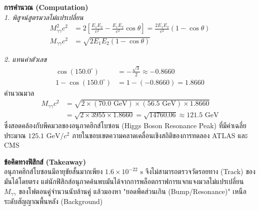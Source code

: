 \begin{psctexample}
\textbf{การคำนวณ (Computation)} \\
\textit{1. พิสูจน์สูตรมวลไม่แปรเปลี่ยน}
\begin{align}
M_{\gamma\gamma}^2 c^2 &= 2 \left[\frac{E_1 E_2}{c^2} - \frac{E_1 E_2}{c^2}\cos\theta\right] = \frac{2 E_1 E_2}{c^2}(1 - \cos\theta) \nonumber \\
M_{\gamma\gamma} c^2 &= \sqrt{2 E_1 E_2 (1 - \cos\theta)}
\end{align}

\textit{2. แทนค่าตัวเลข}
\begin{align}
\cos(150.0^\circ) &= -\frac{\sqrt{3}}{2} \approx -0.8660 \nonumber \\
1 - \cos(150.0^\circ) &= 1 - (-0.8660) = 1.8660
\end{align}
คำนวณมวล
\begin{align}
M_{\gamma\gamma} c^2 &= \sqrt{2 \times (70.0\text{ GeV}) \times (56.5\text{ GeV}) \times 1.8660} \nonumber \\
&= \sqrt{2 \times 3955 \times 1.8660} = \sqrt{14760.06} \approx 121.5\text{ GeV}
\end{align}
ซึ่งสอดคล้องกับพีคมวลของอนุภาคฮิกส์โบซอน (Higgs Boson Resonance Peak) ที่มีค่าเฉลี่ยประมาณ $125.1\text{ GeV}/c^2$ ภายในขอบเขตความคลาดเคลื่อนเชิงสถิติของการทดลอง ATLAS และ CMS

\textbf{ข้อคิดทางฟิสิกส์ (Takeaway)} \\
อนุภาคฮิกส์โบซอนมีอายุขัยสั้นมากเพียง $1.6 \times 10^{-22}\text{ s}$ จึงไม่สามารถตรวจวัดรอยทาง (Track) ของมันได้โดยตรง แต่นักฟิสิกส์อนุภาคค้นพบมันได้จากการพล็อตกราฟการแจกแจงมวลไม่แปรเปลี่ยน $M_{\gamma\gamma}$ ของโฟตอนคู่จำนวนนับล้านคู่ แล้วมองหา "ยอดพีคส่วนเกิน (Bump/Resonance)" เหนือระดับสัญญาณพื้นหลัง (Background)
\qedexam
\end{psctexample}

